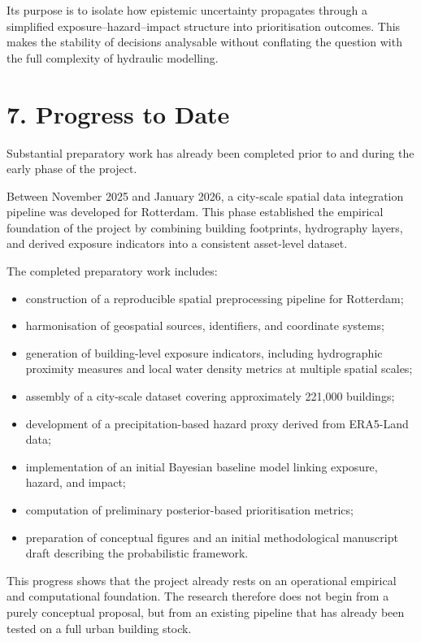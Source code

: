 \documentclass[
]{article}
\providecommand{\tightlist}{%
  \setlength{\itemsep}{0pt}\setlength{\parskip}{0pt}}
\begin{document}
Its purpose is to isolate how epistemic uncertainty propagates through a
simplified exposure--hazard--impact structure into prioritisation
outcomes. This makes the stability of decisions analysable without
conflating the question with the full complexity of hydraulic modelling.

\section{7. Progress to Date}\label{progress-to-date}

Substantial preparatory work has already been completed prior to and
during the early phase of the project.

Between November 2025 and January 2026, a city-scale spatial data
integration pipeline was developed for Rotterdam. This phase established
the empirical foundation of the project by combining building
footprints, hydrography layers, and derived exposure indicators into a
consistent asset-level dataset.

The completed preparatory work includes:

\begin{itemize}
\tightlist
\item
  construction of a reproducible spatial preprocessing pipeline for
  Rotterdam;
\item
  harmonisation of geospatial sources, identifiers, and coordinate
  systems;
\item
  generation of building-level exposure indicators, including
  hydrographic proximity measures and local water density metrics at
  multiple spatial scales;
\item
  assembly of a city-scale dataset covering approximately 221,000
  buildings;
\item
  development of a precipitation-based hazard proxy derived from
  ERA5-Land data;
\item
  implementation of an initial Bayesian baseline model linking exposure,
  hazard, and impact;
\item
  computation of preliminary posterior-based prioritisation metrics;
\item
  preparation of conceptual figures and an initial methodological
  manuscript draft describing the probabilistic framework.
\end{itemize}

This progress shows that the project already rests on an operational
empirical and computational foundation. The research therefore does not
begin from a purely conceptual proposal, but from an existing pipeline
that has already been tested on a full urban building stock.
\end{document}

